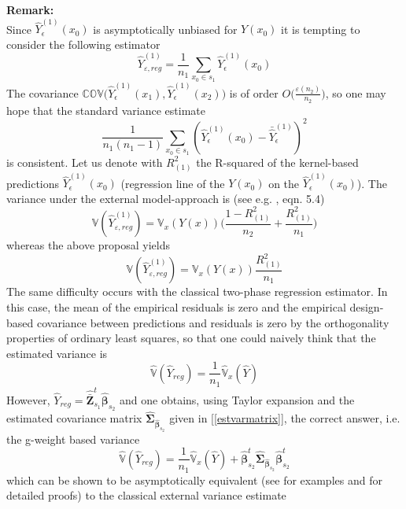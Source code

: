 \documentclass[a4paper,12pt,leqno, titlepage]{article}
\newcommand{\VAR}{\mathbb{V}}
\newcommand{\COV}{\mathbb{COV}}
\begin{document}
\begin{appendix}
\noindent \textbf{Remark:}\\
Since $\hat{Y}^{(1)}_{\epsilon}(x_0)$ is asymptotically unbiased for $Y(x_0)$ it is tempting to consider the following estimator
\begin{equation}\label{badproposal}
\hat{Y}^{(1)}_{\varepsilon,reg}=\frac{1}{n_1}\sum_{x_0\in{s_1}}\hat{Y}^{(1)}_{\epsilon}(x_0)
\end{equation}
The covariance $\COV\big(\hat{Y}^{(1)}_{\epsilon}(x_1),\hat{Y}^{(1)}_{\epsilon}(x_2)\big)$ is of order $O\big(\frac{\varepsilon(n_2)}{n_2}\Big)$, so one may hope that the standard variance estimate
$$\frac{1}{n_1(n_1-1)}\sum_{x_0\in{s_1}}(\hat{Y}^{(1)}_{\epsilon}(x_0)-\bar{\hat{Y}}^{(1)}_{\epsilon})^2$$ is consistent. Let us denote with $R_{(1)}^2$ the R-squared of the kernel-based predictions $\hat{Y}^{(1)}_{\epsilon}(x_0)$ (regression line of the $Y(x_0)$ on the $\hat{Y}^{(1)}_{\epsilon}(x_0)$). The variance under the external model-approach is (see e.g. \cite{mandallaz}, eqn. 5.4)
\begin{equation}\label{extvar}
\VAR(\hat{Y}^{(1)}_{\varepsilon,reg})=\VAR_x(Y(x))\Big(\frac{1-R_{(1)}^2}{n_2}+ \frac{R_{(1)}^2}{n_1}\Big)
\end{equation}
whereas the above proposal yields
\begin{equation}\label{wrongvar1}
\VAR(\hat{Y}^{(1)}_{\varepsilon,reg})=\VAR_x(Y(x))\frac{R_{(1)}^2}{n_1}
\end{equation}
The same difficulty occurs with the classical two-phase regression estimator. In this case, the mean of the empirical residuals is zero and the empirical design-based covariance between predictions and residuals is zero by the orthogonality properties of ordinary least squares, so that one could naively think that the estimated variance is
\begin{equation}\label{wrongvar2}
\hat{\VAR}(\hat{Y}_{reg})=\frac{1}{n_1}\hat{\VAR}_x(\hat{Y})
\end{equation}
However, $\hat{Y}_{reg}=\hat{\bar{\pmb{Z}}}^t_{s_1}\hat{\pmb{\beta}}_{s_2}$ and one obtains, using Taylor expansion and the estimated covariance matrix $\hat{\pmb{\Sigma}}_{\hat{\pmb{\beta}}_{s_2}}$ given in [\ref{estvarmatrix}], the correct answer, i.e. the g-weight based variance
\begin{equation}\label{correctvar}
\hat{\VAR}(\hat{Y}_{reg})=\frac{1}{n_1}\hat{\VAR}_x(\hat{Y})+
\hat{\pmb{\beta}}^t_{s_2}\hat{\pmb{\Sigma}}_{\hat{\pmb{\beta}}_{s_2}}\hat{\pmb{\beta}}^t_{s_2}
\end{equation}
which can be shown to be asymptotically equivalent (see \cite{mandallaz3} for examples and \cite{mandallazreport1} for detailed proofs) to the classical external variance estimate

\end{appendix}
\end{document}
